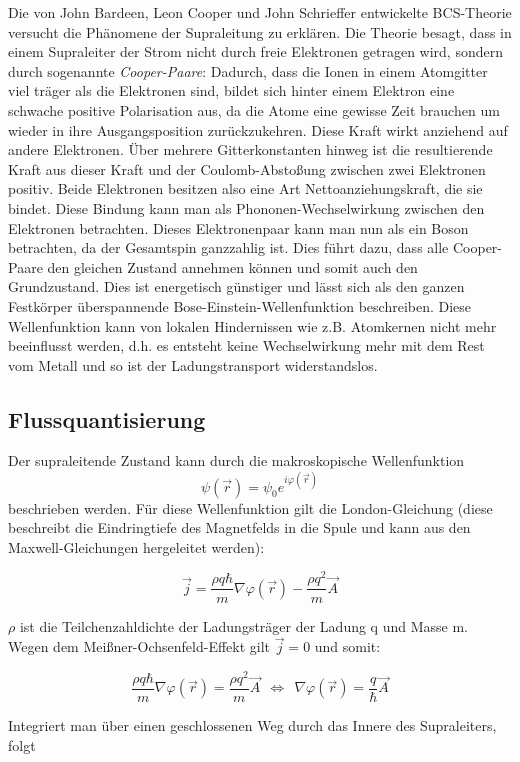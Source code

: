 Die von John Bardeen, Leon Cooper und John Schrieffer entwickelte BCS-Theorie versucht die Phänomene der Supraleitung zu erklären. Die Theorie besagt, dass in einem Supraleiter der Strom nicht durch freie Elektronen getragen wird, sondern durch sogenannte \emph{Cooper-Paare}: Dadurch, dass die Ionen in einem Atomgitter viel träger als die Elektronen sind, bildet sich hinter einem Elektron eine schwache positive Polarisation aus, da die Atome eine gewisse Zeit brauchen um wieder in ihre Ausgangsposition zurückzukehren. Diese Kraft wirkt anziehend auf andere Elektronen. Über mehrere Gitterkonstanten hinweg ist die resultierende Kraft aus dieser Kraft und der Coulomb-Abstoßung zwischen zwei Elektronen positiv. Beide Elektronen besitzen also eine Art Nettoanziehungskraft, die sie bindet. Diese Bindung kann man als Phononen-Wechselwirkung zwischen den Elektronen betrachten. Dieses Elektronenpaar kann man nun als ein Boson betrachten, da der Gesamtspin ganzzahlig ist. Dies führt dazu, dass alle Cooper-Paare den gleichen Zustand annehmen können und somit auch den Grundzustand. Dies ist energetisch günstiger und lässt sich als den ganzen Festkörper überspannende Bose-Einstein-Wellenfunktion beschreiben. Diese Wellenfunktion kann von lokalen Hindernissen wie z.B. Atomkernen nicht mehr beeinflusst werden, d.h. es entsteht keine Wechselwirkung mehr mit dem Rest vom Metall  und so ist der Ladungstransport widerstandslos.

\subsection{Flussquantisierung}

Der supraleitende Zustand kann durch die makroskopische Wellenfunktion $$\psi(\vec r) = \psi_0e^{i\varphi(\vec r)}$$ beschrieben werden. Für diese Wellenfunktion gilt die London-Gleichung (diese beschreibt die Eindringtiefe des Magnetfelds in die Spule und kann aus den Maxwell-Gleichungen hergeleitet werden):

$$\vec j = \frac{\rho q\hbar}{m}\nabla \varphi(\vec r) - \frac{\rho q^2}{m}\vec A$$ 

$\rho$ ist die Teilchenzahldichte der Ladungsträger der Ladung q und Masse m. Wegen dem Meißner-Ochsenfeld-Effekt gilt $\vec j = 0$ und somit:

$$ \frac{\rho q\hbar}{m}\nabla \varphi(\vec r) = \frac{\rho q^2}{m}\vec A \ \ \Leftrightarrow \ \ \nabla\varphi(\vec r) = \frac{q}{\hbar}\vec A$$

Integriert man über einen geschlossenen Weg durch das Innere des Supraleiters, folgt

